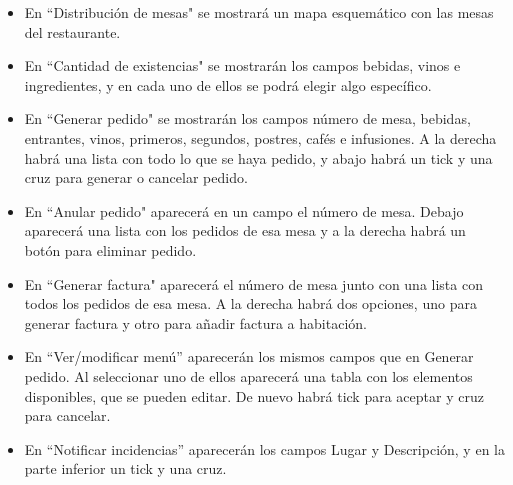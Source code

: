 \documentclass[spanish,a4paper,11pt, twoside]{report}	%
\begin{document}
\begin{itemize}
\begin{itemize}
\begin{itemize}
						\item En “Distribución de mesas" se mostrará un mapa esquemático con las mesas del restaurante. 
						\item En “Cantidad de existencias" se mostrarán los campos bebidas, vinos e ingredientes, y en cada uno de ellos se podrá elegir algo específico. 
						\item En “Generar pedido" se mostrarán los campos número de mesa, bebidas, entrantes, vinos, primeros, segundos, postres, cafés e infusiones. A la derecha habrá una lista con todo lo que se haya pedido, y abajo habrá un tick y una cruz para generar o cancelar pedido. 
						\item En “Anular pedido" aparecerá en un campo el número de mesa. Debajo aparecerá una lista con los pedidos de esa mesa y a la derecha habrá un botón para eliminar pedido. 
						\item En “Generar factura" aparecerá el número de mesa junto con una lista con todos los pedidos de esa mesa. A la derecha habrá dos opciones, uno para generar factura y otro para añadir factura a habitación.
						\item En “Ver/modificar menú'' aparecerán los mismos campos que en Generar pedido. Al seleccionar uno de ellos aparecerá una tabla con los elementos disponibles, que se pueden editar. De nuevo habrá tick para aceptar y cruz para cancelar. 
						\item En “Notificar incidencias'' aparecerán los campos Lugar y Descripción, y en la parte inferior un tick y una cruz. 
					\end{itemize}
					

\end{itemize}
\end{itemize}
\end{document}

